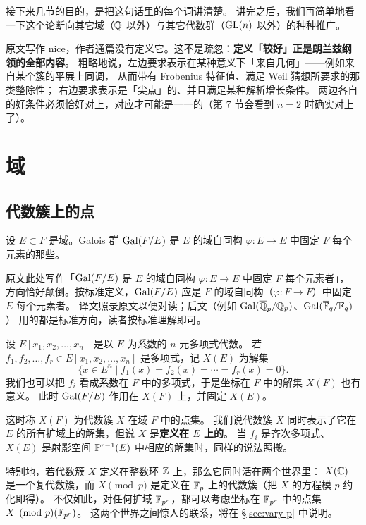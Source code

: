 接下来几节的目的，是把这句话里的每个词讲清楚。
讲完之后，我们再简单地看一下这个论断向其它域（$\mathbb{Q}$ 以外）与其它代数群（$\mathrm{GL}(n)$ 以外）的种种推广。

\begin{yizhu}
原文写作 nice，作者通篇没有定义它。这不是疏忽：\textbf{定义「较好」正是朗兰兹纲领的全部内容}。
粗略地说，左边要求表示在某种意义下「来自几何」——例如来自某个簇的平展上同调，
从而带有 Frobenius 特征值、满足 Weil 猜想所要求的那类整除性；
右边要求表示是「尖点」的、并且满足某种解析增长条件。
两边各自的好条件必须恰好对上，对应才可能是一一的（第 7 节会看到 $n=2$ 时确实对上了）。
\end{yizhu}

\section{域}
\label{sec:fields}

\subsection{代数簇上的点}

设 $E\subset F$ 是域。Galois 群 $\mathrm{Gal}(F/E)$ 是 $E$ 的域自同构 $\varphi:E\to E$ 中固定 $F$ 每个元素的那些。

\begin{yizhu}
原文此处写作「$\mathrm{Gal}(F/E)$ 是 $E$ 的域自同构 $\varphi:E\to E$ 中固定 $F$ 每个元素者」，
方向恰好颠倒。按标准定义，$\mathrm{Gal}(F/E)$ 应是 $F$ 的域自同构（$\varphi:F\to F$）中固定 $E$ 每个元素者。
译文照录原文以便对读；后文（例如 $\mathrm{Gal}(\overline{\mathbb{Q}}_p/\mathbb{Q}_p)$、$\mathrm{Gal}(\overline{\mathbb{F}}_q/\mathbb{F}_q)$）
用的都是标准方向，读者按标准理解即可。
\end{yizhu}

设 $E[x_1,x_2,\dots,x_n]$ 是以 $E$ 为系数的 $n$ 元多项式代数。
若 $f_1,f_2,\dots,f_r\in E[x_1,x_2,\dots,x_n]$ 是多项式，记 $X(E)$ 为解集
\[
\{x\in E^n\mid f_1(x)=f_2(x)=\cdots=f_r(x)=0\}.
\]
我们也可以把 $f_i$ 看成系数在 $F$ 中的多项式，于是坐标在 $F$ 中的解集 $X(F)$ 也有意义。
此时 $\mathrm{Gal}(F/E)$ 作用在 $X(F)$ 上，并固定 $X(E)$。

这时称 $X(F)$ 为代数簇 $X$ 在域 $F$ 中的点集。
我们说代数簇 $X$ 同时表示了它在 $E$ 的所有扩域上的解集，但说 $X$ 是\textbf{定义在 $E$ 上的}。
当 $f_i$ 是齐次多项式、$X(E)$ 是射影空间 $\mathbb{P}^{r-1}(E)$ 中相应的解集时，同样的说法照搬。

特别地，若代数簇 $X$ 定义在整数环 $\mathbb{Z}$ 上，那么它同时活在两个世界里：
$X(\mathbb{C})$ 是一个复代数簇，而 $X\pmod p$ 是定义在 $\mathbb{F}_p$ 上的代数簇（把 $X$ 的方程模 $p$ 约化即得）。
不仅如此，对任何扩域 $\mathbb{F}_{p^r}$，都可以考虑坐标在 $\mathbb{F}_{p^r}$ 中的点集 $X\pmod p(\mathbb{F}_{p^r})$。
这两个世界之间惊人的联系，将在 \S\ref{sec:vary-p} 中说明。

